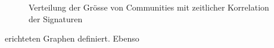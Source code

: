 \begin{figure}[t]
  \caption{Verteilung der Gr\"osse von Communities mit zeitlicher
    Korrelation der Signaturen}
  \label{fig:comsizedist}
\end{figure}

erichteten Graphen definiert. Ebenso 

